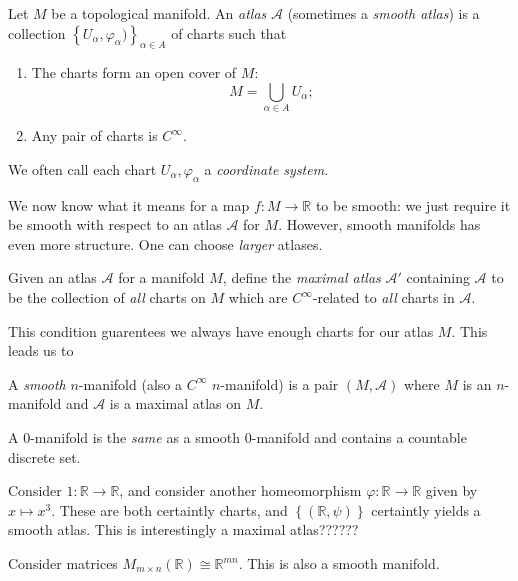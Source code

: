 \begin{definition}\label{1.1.5}
	Let $M$ be a topological manifold. An \emph{atlas} $\mathcal{A} $ (sometimes a \emph{smooth atlas}) is a collection $\left\{ U_\alpha ,\varphi _\alpha ) \right\}_{\alpha \in A} $ of charts such that
	\begin{enumerate}
		\item The charts form an open cover of $M$:
			\[
				M=\bigcup_{\alpha \in A} U_\alpha 
			;\]
		\item Any pair of charts is $C^\infty $.
	\end{enumerate}
\end{definition}

\begin{terminology}\label{1.1.6}
	We often call each chart $U_\alpha ,\varphi _\alpha $ a \emph{coordinate system}.
\end{terminology}

We now know what it means for a map $f : M \to \mathbb{R} $ to be smooth: we just require it be smooth with respect to an atlas $\mathcal{A} $ for $M$. However, smooth manifolds has even more structure. One can choose \emph{larger} atlases.

\begin{definition}\label{1.1.7}
	Given an atlas $\mathcal{A} $ for a manifold $M$, define the \emph{maximal atlas} $\mathcal{A}'$ containing $\mathcal{A} $ to be the collection of \emph{all} charts on $M$ which are $C^\infty $-related to \emph{all} charts in $\mathcal{A} $.
\end{definition}

This condition guarentees we always have enough charts for our atlas $M$. This leads us to

\begin{definition}\label{1.1.8}
	A \emph{smooth} $n$-manifold (also a $C^\infty $ $n$-manifold) is a pair $(M,\mathcal{A} )$ where $M$ is an $n$-manifold and $\mathcal{A} $ is a maximal atlas on $M$.
\end{definition}

\begin{example}\label{1.1.9}
	A 0-manifold is the \emph{same} as a smooth 0-manifold and contains a countable discrete set.

	Consider $1: \mathbb{R}  \to \mathbb{R} $, and consider another homeomorphism $\varphi : \mathbb{R}  \to \mathbb{R} $ given by $x\mapsto x^3$. These are both certaintly charts, and $\left\{ (\mathbb{R} ,\psi ) \right\} $ certaintly yields a smooth atlas. This is interestingly a maximal atlas??????

	Consider matrices $M_{m\times n} (\mathbb{R} )\cong \mathbb{R} ^{mn} $. This is also a smooth manifold.
\end{example}

